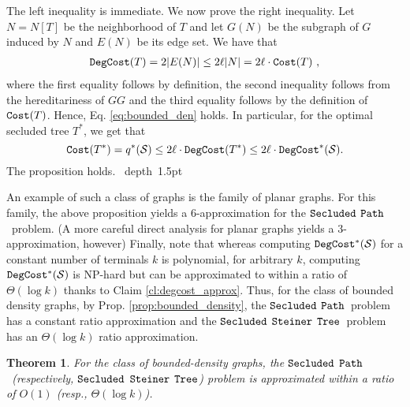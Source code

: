 \documentclass[12pt]{article}
\newtheorem{theorem}{Theorem}[section]
\def\Cost{\mbox{\tt Cost}}
\def\blackslug{\hbox{\hskip 1pt \vrule width 4pt height 8pt
    depth 1.5pt \hskip 1pt}}
\def\QED{\quad\blackslug\lower 8.5pt\null\par}
\newcommand{\PS}[0]{$\mbox{\tt Secluded}$ $\mbox{\tt Steiner}$
$\mbox{\tt Tree}$}
\newcommand{\Terminals}[0]{\mathcal{S}}
\newcommand{\PP}[0]{$\mbox{\tt Secluded}$ $\mbox{\tt Path}$}
\def\Cost{\mbox{\tt Cost}}
\def\DegCost{\mbox{\tt DegCost}}
\begin{document}
The left inequality is immediate. We now prove the right inequality. Let $N=N[T]$ be the neighborhood of $T$ and let $G(N)$ be the subgraph of $G$ induced by $N$ and $E(N)$ be its edge set. We have that
\begin{eqnarray*}
\DegCost(T) =2|E(N)| \leq 2\ell |N| = 2\ell\cdot \Cost(T)~,
\end{eqnarray*}
where the first equality follows by definition, the second inequality follows from the hereditariness of $GG$ and the third equality follows by the definition of $\Cost(T)$.
Hence, Eq. \ref{eq:bounded_den} holds. In particular, for the optimal secluded tree $T^{*}$, we get that $$\Cost(T^{*})=q^{*}(\Terminals)\leq 2\ell \cdot \DegCost(T^{*}) \leq 2\ell \cdot \DegCost^*(\Terminals).$$ The proposition holds.
\QED
An example of such a class of graphs is the family of planar graphs. For this family, the above proposition yields a 6-approximation for the \PP\ problem. (A more careful direct analysis for planar graphs yields a 3-approximation, however) Finally, note that whereas computing $\DegCost^*(\Terminals)$ for a constant number of terminals $k$ is polynomial, for arbitrary $k$, computing $\DegCost^*(\Terminals)$ is NP-hard but can be approximated to within a ratio of $\Theta(\log k)$ thanks to Claim \ref{cl:degcost_approx}. Thus, for the class of bounded density graphs, by Prop. \ref{prop:bounded_density}, the \PP\ problem has a constant ratio approximation and the \PS\ problem has an $\Theta(\log k)$ ratio approximation.
\begin{theorem}
For the class of bounded-density graphs, the \PP\ (respectively, \PS) problem
is approximated within a ratio of $O(1)$ (resp., $\Theta(\log k)$).
\end{theorem}
\end{document}
